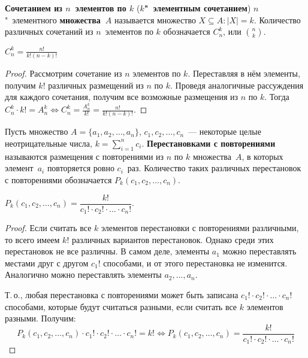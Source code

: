  \textbf{Сочетанием из $n$~элементов по $k$} (\textbf{$k$"~элементным сочетанием}) $n$"~элементного \textbf{множества~$A$} называется множество $X \subseteq A \colon |X| = k$.
Количество различных сочетаний из $n$~элементов по $k$ обозначается $C_n^k$, или $\binom{n}{k}$.

\begin{statement}
$C_n^k = \frac{n!}{k! (n - k)!}$
\end{statement}
\begin{proof}
Рассмотрим сочетание из $n$ элементов по $k$.
Переставляя в нём элементы, получим $k!$ различных размещений из $n$ по $k$.
Проведя аналогичные рассуждения для каждого сочетания, получим все возможные размещения из $n$ по $k$.
Тогда $C_n^k \cdot k! = A_n^k \Leftrightarrow C_n^k = \frac{A_n^k}{k!} = \frac{n!}{k! (n - k)!}$.
\end{proof}

 Пусть множество $A = \{ a_1, a_2, \ldots, a_n \}$, $c_1, c_2, \ldots, c_n$~--- некоторые целые неотрицательные числа, $k = \sum\limits_{i=1}^n c_i$.
\textbf{Перестановками с повторениями} называются размещения с повторениями из $n$ по $k$ множества~$A$, в которых элемент~$a_i$ повторяется ровно $c_i$~раз.
Количество таких различных перестановок с повторениями обозначается $P_k(c_1, c_2, \ldots, c_n)$.

\begin{statement}
$P_k(c_1, c_2, \ldots, c_n) = \dfrac{k!}{c_1! \cdot c_2! \cdot \ldots \cdot c_n!}$.
\end{statement}
\begin{proof}
Если считать все $k$ элементов перестановки с повторениями различными, то всего имеем $k!$ различных вариантов перестановок.
Однако среди этих перестановок не все различны.
В самом деле, элементы $a_1$ можно переставлять местами друг с другом $c_1!$ способами, и от этого перестановка не изменится.
Аналогично можно переставлять элементы $a_2, \ldots, a_n$.

Т.\,о., любая перестановка с повторениями может быть записана $c_1! \cdot c_2! \cdot \ldots \cdot c_n!$ способами, которые будут считаться разными, если считать все $k$ элементов разными.
Получим:
\begin{equation*}
P_k(c_1, c_2, \ldots, c_n) \cdot c_1! \cdot c_2! \cdot \ldots \cdot c_n! = k! \Leftrightarrow
P_k(c_1, c_2, \ldots, c_n) = \frac{k!}{c_1! \cdot c_2! \cdot \ldots \cdot c_n!}
\end{equation*}
\end{proof}

